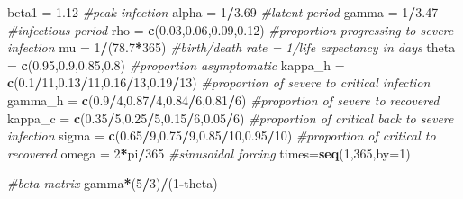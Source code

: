 \documentclass[
]{article}
\newenvironment{Shaded}{\begin{snugshade}}{\end{snugshade}}
\newcommand{\CommentTok}[1]{\textcolor[rgb]{0.56,0.35,0.01}{\textit{#1}}}
\newcommand{\DataTypeTok}[1]{\textcolor[rgb]{0.13,0.29,0.53}{#1}}
\newcommand{\DecValTok}[1]{\textcolor[rgb]{0.00,0.00,0.81}{#1}}
\newcommand{\FloatTok}[1]{\textcolor[rgb]{0.00,0.00,0.81}{#1}}
\newcommand{\KeywordTok}[1]{\textcolor[rgb]{0.13,0.29,0.53}{\textbf{#1}}}
\newcommand{\NormalTok}[1]{#1}
\newcommand{\OperatorTok}[1]{\textcolor[rgb]{0.81,0.36,0.00}{\textbf{#1}}}
\newcommand{\StringTok}[1]{\textcolor[rgb]{0.31,0.60,0.02}{#1}}
\begin{document}
\begin{Shaded}
\begin{Highlighting}[]
\NormalTok{beta1 =}\StringTok{ }\FloatTok{1.12} \CommentTok{#peak infection}
\NormalTok{alpha =}\StringTok{ }\DecValTok{1}\OperatorTok{/}\FloatTok{3.69} \CommentTok{#latent period}
\NormalTok{gamma =}\StringTok{ }\DecValTok{1}\OperatorTok{/}\FloatTok{3.47} \CommentTok{#infectious period}
\NormalTok{rho =}\StringTok{ }\KeywordTok{c}\NormalTok{(}\FloatTok{0.03}\NormalTok{,}\FloatTok{0.06}\NormalTok{,}\FloatTok{0.09}\NormalTok{,}\FloatTok{0.12}\NormalTok{) }\CommentTok{#proportion progressing to severe infection}
\NormalTok{mu =}\StringTok{ }\DecValTok{1}\OperatorTok{/}\NormalTok{(}\FloatTok{78.7}\OperatorTok{*}\DecValTok{365}\NormalTok{) }\CommentTok{#birth/death rate = 1/life expectancy in days}
\NormalTok{theta =}\StringTok{ }\KeywordTok{c}\NormalTok{(}\FloatTok{0.95}\NormalTok{,}\FloatTok{0.9}\NormalTok{,}\FloatTok{0.85}\NormalTok{,}\FloatTok{0.8}\NormalTok{) }\CommentTok{#proportion asymptomatic}
\NormalTok{kappa_h =}\StringTok{ }\KeywordTok{c}\NormalTok{(}\FloatTok{0.1}\OperatorTok{/}\DecValTok{11}\NormalTok{,}\FloatTok{0.13}\OperatorTok{/}\DecValTok{11}\NormalTok{,}\FloatTok{0.16}\OperatorTok{/}\DecValTok{13}\NormalTok{,}\FloatTok{0.19}\OperatorTok{/}\DecValTok{13}\NormalTok{) }\CommentTok{#proportion of severe to critical infection}
\NormalTok{gamma_h =}\StringTok{ }\KeywordTok{c}\NormalTok{(}\FloatTok{0.9}\OperatorTok{/}\DecValTok{4}\NormalTok{,}\FloatTok{0.87}\OperatorTok{/}\DecValTok{4}\NormalTok{,}\FloatTok{0.84}\OperatorTok{/}\DecValTok{6}\NormalTok{,}\FloatTok{0.81}\OperatorTok{/}\DecValTok{6}\NormalTok{) }\CommentTok{#proportion of severe to recovered}
\NormalTok{kappa_c =}\StringTok{ }\KeywordTok{c}\NormalTok{(}\FloatTok{0.35}\OperatorTok{/}\DecValTok{5}\NormalTok{,}\FloatTok{0.25}\OperatorTok{/}\DecValTok{5}\NormalTok{,}\FloatTok{0.15}\OperatorTok{/}\DecValTok{6}\NormalTok{,}\FloatTok{0.05}\OperatorTok{/}\DecValTok{6}\NormalTok{) }\CommentTok{#proportion of critical back to severe infection}
\NormalTok{sigma =}\StringTok{ }\KeywordTok{c}\NormalTok{(}\FloatTok{0.65}\OperatorTok{/}\DecValTok{9}\NormalTok{,}\FloatTok{0.75}\OperatorTok{/}\DecValTok{9}\NormalTok{,}\FloatTok{0.85}\OperatorTok{/}\DecValTok{10}\NormalTok{,}\FloatTok{0.95}\OperatorTok{/}\DecValTok{10}\NormalTok{) }\CommentTok{#proportion of critical to recovered}
\NormalTok{omega =}\StringTok{ }\DecValTok{2}\OperatorTok{*}\NormalTok{pi}\OperatorTok{/}\DecValTok{365} \CommentTok{#sinusoidal forcing}
\NormalTok{times=}\KeywordTok{seq}\NormalTok{(}\DecValTok{1}\NormalTok{,}\DecValTok{365}\NormalTok{,}\DataTypeTok{by=}\DecValTok{1}\NormalTok{) }

\CommentTok{#beta matrix}
\NormalTok{gamma}\OperatorTok{*}\NormalTok{(}\DecValTok{5}\OperatorTok{/}\DecValTok{3}\NormalTok{)}\OperatorTok{/}\NormalTok{(}\DecValTok{1}\OperatorTok{-}\NormalTok{theta)}
\end{Highlighting}
\end{Shaded}
\end{document}
